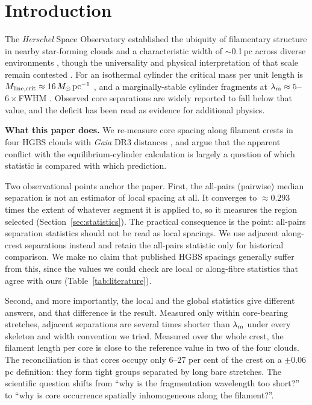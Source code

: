 \documentclass[usenatbib,twoside,twocolumn]{mnras}
\begin{document}
\section{Introduction}

The \textit{Herschel} Space Observatory established the ubiquity of filamentary structure in nearby star-forming clouds \citep{Andre2010} and a characteristic width of $\sim$0.1\,pc across diverse environments \citep{Arzoumanian2011}, though the universality and physical interpretation of that scale remain contested \citep{Panopoulou2017,Panopoulou2022}. For an isothermal cylinder the critical mass per unit length is $M_{\rm line,crit}\approx16\,M_\odot\,{\rm pc^{-1}}$ \citep{Ostriker1964}, and a marginally-stable cylinder fragments at $\lambda_{\rm m}\approx5$--$6\times$FWHM \citep{Inutsuka1992,Fischera2012}. Observed core separations are widely reported to fall below that value, and the deficit has been read as evidence for additional physics.

\smallskip\noindent\textbf{What this paper does.} We re-measure core spacing along filament crests in four HGBS clouds with \textit{Gaia} DR3 distances \citep{Zhang2023}, and argue that the apparent conflict with the equilibrium-cylinder calculation is largely a question of which statistic is compared with which prediction.

Two observational points anchor the paper. First, the all-pairs (pairwise) median separation is not an estimator of local spacing at all. It converges to $\approx0.293$ times the extent of whatever segment it is applied to, so it measures the region selected (Section~\ref{sec:statistics}). The practical consequence is the point: all-pairs separation statistics should not be read as local spacings. We use adjacent along-crest separations instead and retain the all-pairs statistic only for historical comparison. We make no claim that published HGBS spacings generally suffer from this, since the values we could check are local or along-fibre statistics that agree with ours (Table~\ref{tab:literature}).

Second, and more importantly, the local and the global statistics give different answers, and that difference is the result. Measured only within core-bearing stretches, adjacent separations are several times shorter than $\lambda_{\rm m}$ under every skeleton and width convention we tried. Measured over the whole crest, the filament length per core is close to the reference value in two of the four clouds. The reconciliation is that cores occupy only $6$--$27$ per cent of the crest on a $\pm0.06$\,pc definition: they form tight groups separated by long bare stretches. The scientific question shifts from ``why is the fragmentation wavelength too short?'' to ``why is core occurrence spatially inhomogeneous along the filament?''.
\end{document}

